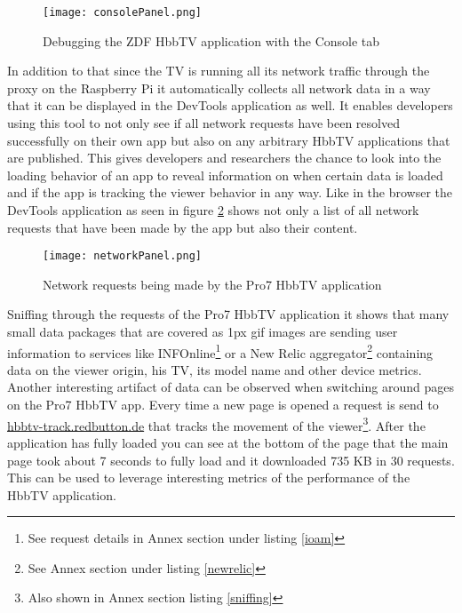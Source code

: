 \begin{figure}[htb]
  \centering
  \hspace*{-0.7cm}
  \texttt{[image: consolePanel.png]}\\
  \caption{Debugging the ZDF HbbTV application with the Console tab}\label{fig:consolePanel}
\end{figure}

In addition to that since the TV is running all its network traffic through the proxy on the Raspberry Pi it automatically collects all network data in a way that it can be displayed in the DevTools application as well. It enables developers using this tool to not only see if all network requests have been resolved successfully on their own app but also on any arbitrary HbbTV applications that are published. This gives developers and researchers the chance to look into the loading behavior of an app to reveal information on when certain data is loaded and if the app is tracking the viewer behavior in any way. Like in the browser the DevTools application as seen in figure \ref{fig:networkPanel} shows not only a list of all network requests that have been made by the app but also their content.

\begin{figure}[htb]
  \centering
  \hspace*{-0.7cm}
  \texttt{[image: networkPanel.png]}\\
  \caption{Network requests being made by the Pro7 HbbTV application}\label{fig:networkPanel}
\end{figure}

Sniffing through the requests of the Pro7 HbbTV application it shows that many small data packages that are covered as 1px gif images are sending user information to services like INFOnline\footnote{See request details in Annex section under listing \ref{ioam}} or a New Relic aggregator\footnote{See Annex section under listing \ref{newrelic}} containing data on the viewer origin, his TV, its model name and other device metrics. Another interesting artifact of data can be observed when switching around pages on the Pro7 HbbTV app. Every time a new page is opened a request is send to \url{hbbtv-track.redbutton.de} that tracks the movement of the viewer\footnote{Also shown in Annex section listing \ref{sniffing}}. After the application has fully loaded you can see at the bottom of the page that the main page took about 7 seconds to fully load and it downloaded 735 KB in 30 requests. This can be used to leverage interesting metrics of the performance of the HbbTV application.

